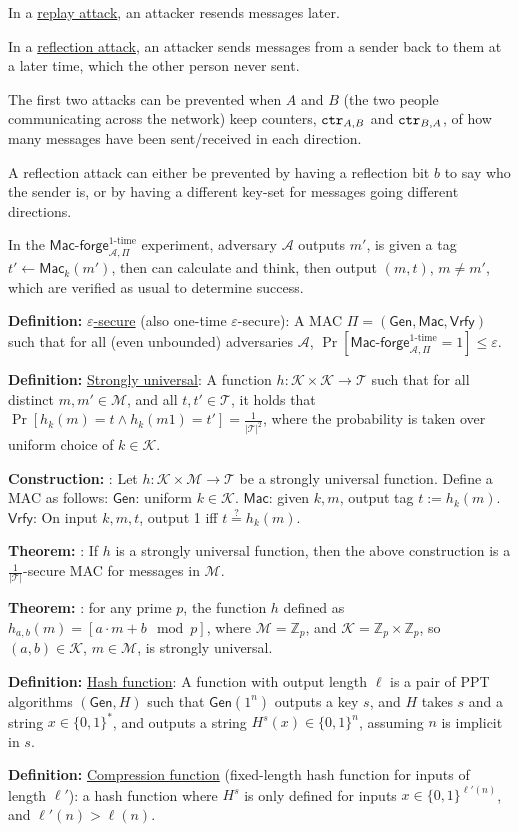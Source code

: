 \documentclass[12pt]{article}
\newcommand{\Z}{\mathbb{Z}}
\newcommand{\AAA}{\mathcal{A}}
\newcommand{\KKK}{\mathcal{K}}
\newcommand{\MMM}{\mathcal{M}}
\newcommand{\TTT}{\mathcal{T}}
\newcommand{\defn}[1]{{\bf Definition:} \underline{#1}}
\newcommand{\thm}[1]{{\bf Theorem:} \underline{#1}}
\newcommand{\con}[1]{{\bf Construction:} \underline{#1}}
\newcommand{\Mac}{\mathsf{Mac}}
\newcommand{\Macf}{\mathsf{Mac\text{-}forge}}
\newcommand{\Vrfy}{\mathsf{Vrfy}}
\newcommand{\Gen}{\mathsf{Gen}}
\newcommand{\GenMacVrfy}{(\Gen,\Mac,\Vrfy)}
\newcommand{\ctr}{{\tt ctr}}
\newcommand{\from}{\leftarrow}
\begin{document}
\begin{multicols}{2}
In a \underline{replay attack}, an attacker resends messages later.

In a \underline{reflection attack}, an attacker sends messages from a sender back to them at a later time, which the other person never sent.

The first two attacks can be prevented when $A$ and $B$ (the two people communicating across the network) keep counters, $\ctr_{A,B}$ and $\ctr_{B,A}$, of how many messages have been sent/received in each direction.

A reflection attack can either be prevented by having a reflection bit $b$ to say who the sender is, or by having a different key-set for messages going different directions.

In the $\Macf_{\AAA,\Pi}^{\text{1-time}}$ experiment, adversary $\AAA$ outputs $m'$, is given a tag $t'\from\Mac_k(m')$, then can calculate and think, then output $(m,t)$, $m\neq m'$, which are verified as usual to determine success.

\defn{$\varepsilon$-secure} (also one-time $\varepsilon$-secure): A MAC $\Pi=\GenMacVrfy$ such that for all (even unbounded) adversaries $\AAA$, $\Pr[\Macf_{\AAA,\Pi}^{\text{1-time}}=1]\leq\varepsilon$.

\defn{Strongly universal}: A function $h:\KKK\times\KKK\to\TTT$ such that for all distinct $m,m'\in\MMM$, and all $t,t'\in\TTT$, it holds that $\Pr[h_k(m)=t\wedge h_k(m1)=t']=\frac{1}{|\TTT|^2}$, where the probability is taken over uniform choice of $k\in\KKK$.

\con{}: Let $h:\KKK\times\MMM\to\TTT$ be a strongly universal function. Define a MAC as follows: $\Gen$: uniform $k\in\KKK$. $\Mac$: given $k,m$, output tag $t:=h_k(m)$. $\Vrfy$: On input $k,m,t$, output 1 iff $t\overset{?}{=}h_k(m)$.

\thm{}: If $h$ is a strongly universal function, then the above construction is a $\frac{1}{|\TTT|}$-secure MAC for messages in $\MMM$.

\thm{}: for any prime $p$, the function $h$ defined as $h_{a,b}(m)=[a\cdot m+b\mod{p}]$, where $\MMM=\Z_p$, and $\KKK=\Z_p\times\Z_p$, so $(a,b)\in\KKK$, $m\in\MMM$, is strongly universal.

\defn{Hash function}: A function with output length $\ell$ is a pair of PPT algorithms $(\Gen, H)$ such that $\Gen(1^n)$ outputs a key $s$, and $H$ takes $s$ and a string $x\in\{0,1\}^*$, and outputs a string $H^s(x)\in\{0,1\}^n$, assuming $n$ is implicit in $s$.

\defn{Compression function} (fixed-length hash function for inputs of length $\ell'$): a hash function where $H^s$ is only defined for inputs $x\in\{0,1\}^{\ell'(n)}$, and $\ell'(n)>\ell(n)$.


\end{multicols}
\end{document}
